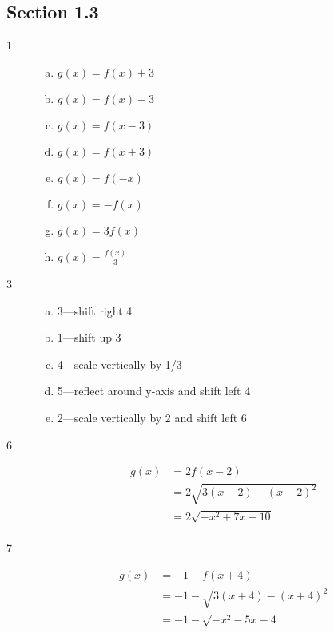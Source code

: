 \documentclass[letterpaper, landscape]{exam}
\begin{document}
    \subsection{Section 1.3}
    \begin{description}
      \item[1]
        \begin{enumerate}[(a)]
          \item $g(x) = f(x) + 3$
          \item $g(x) = f(x) - 3$
          \item $g(x) = f(x - 3)$
          \item $g(x) = f(x + 3)$
          \item $g(x) = f(-x)$
          \item $g(x) = -f(x)$
          \item $g(x) = 3f(x)$
          \item $g(x) = \frac{f(x)}{3}$
        \end{enumerate}

      \item[3]
        \begin{enumerate}[(a)]
          \item 3---shift right 4
          \item 1---shift up 3
          \item 4---scale vertically by 1/3
          \item 5---reflect around y-axis and shift left 4
          \item 2---scale vertically by 2 and shift left 6 
        \end{enumerate}

      \item[6]
        \begin{align*}
          g(x) & = 2 f(x - 2) \\
               & = 2 \sqrt{3(x - 2) - (x - 2)^2} \\
               & = 2 \sqrt{-x^2 + 7x - 10} \\
        \end{align*}

      \item[7]
        \begin{align*}
          g(x) & = -1 - f(x + 4) \\
               & = -1 -\sqrt{3 (x+4)-(x+4)^2} \\
               & = -1 -\sqrt{-x^2-5 x-4} \\
        \end{align*}


\end{description}
\end{document}
